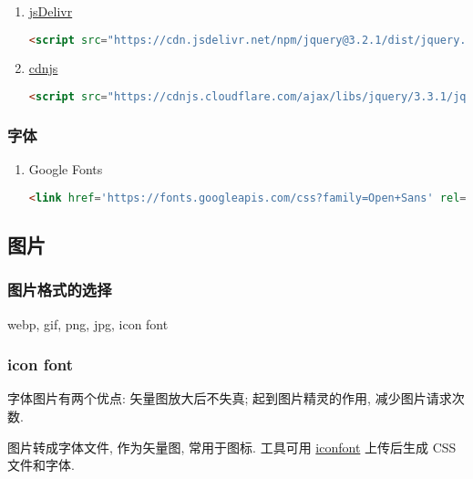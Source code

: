 \begin{enumerate}
\def\labelenumi{\arabic{enumi}.}
\item
  \href{https://www.jsdelivr.com/}{jsDelivr}

\begin{lstlisting}[language=HTML]
<script src="https://cdn.jsdelivr.net/npm/jquery@3.2.1/dist/jquery.min.js"></script>
\end{lstlisting}
\item
  \href{https://cdnjs.com/}{cdnjs}

\begin{lstlisting}[language=HTML]
<script src="https://cdnjs.cloudflare.com/ajax/libs/jquery/3.3.1/jquery.min.js"></script>
\end{lstlisting}
\end{enumerate}

\subsubsection{字体}\label{ux5b57ux4f53}

\begin{enumerate}
\def\labelenumi{\arabic{enumi}.}
\item
  Google Fonts

\begin{lstlisting}[language=HTML]
<link href='https://fonts.googleapis.com/css?family=Open+Sans' rel='stylesheet'>
\end{lstlisting}
\end{enumerate}

\subsection{图片}\label{ux56feux7247}

\subsubsection{图片格式的选择}\label{ux56feux7247ux683cux5f0fux7684ux9009ux62e9}

webp, gif, png, jpg, icon font

\subsubsection{icon font}\label{icon-font}

字体图片有两个优点: 矢量图放大后不失真; 起到图片精灵的作用,
减少图片请求次数.

图片转成字体文件, 作为矢量图, 常用于图标. 工具可用
\href{http://www.iconfont.cn/}{iconfont} 上传后生成 CSS 文件和字体.

